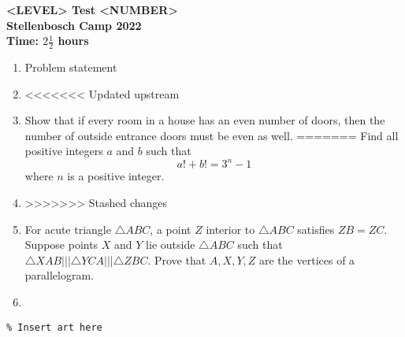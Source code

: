 \documentclass{article}
\begin{document}
\thispagestyle{empty}

\begin{center}
  \textbf{\Large <LEVEL> Test <NUMBER>}
  \\ \vspace{1em}
  \textbf{\large Stellenbosch Camp 2022}
  \\ \vspace{1em}
  \textbf{\large Time: $2\frac{1}{2}$ hours}
\end{center}

\bigskip

\begin{enumerate}[itemsep=\fill]

\item %
Problem statement


\item %

<<<<<<< Updated upstream
\item %
Show that if every room in a house has an even number of doors, then the number of outside entrance doors must be even as well.
=======
Find all positive integers $a$ and $b$ such that 
$$a! + b! = 3^n -1 $$
where $n$ is a positive integer.
\item %
>>>>>>> Stashed changes


\item %
For acute triangle $\triangle ABC$, a point $Z$ interior to $\triangle ABC$ satisfies $ZB=ZC$. Suppose points $X$ and $Y$ lie outside $\triangle ABC$ such that $\triangle XAB |||\triangle YCA |||\triangle ZBC$. Prove that $A,X,Y,Z$ are the vertices of a parallelogram. 


\item %

\end{enumerate}


\centering
\small
\begin{BVerbatim}
\end{BVerbatim}
\end{document}
